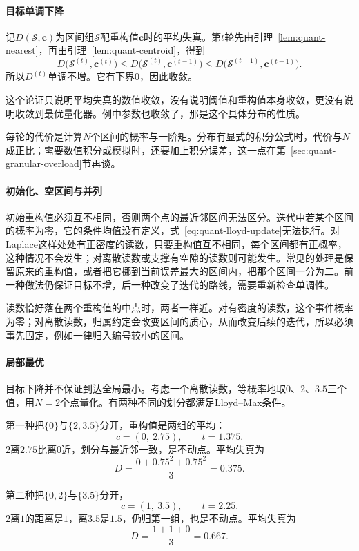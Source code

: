 \paragraph{目标单调下降}
记$D(\mathcal{S},\bm{c})$为区间组$\mathcal{S}$配重构值$\bm{c}$时的平均失真。第$t$轮先由引理~\ref{lem:quant-nearest}，再由引理~\ref{lem:quant-centroid}，得到
\[
 D\bigl(\mathcal{S}^{(t)},\bm{c}^{(t)}\bigr)\leq D\bigl(\mathcal{S}^{(t)},\bm{c}^{(t-1)}\bigr)\leq D\bigl(\mathcal{S}^{(t-1)},\bm{c}^{(t-1)}\bigr) .
\]
所以$D^{(t)}$单调不增。它有下界$0$，因此收敛。

这个论证只说明平均失真的数值收敛，没有说明阈值和重构值本身收敛，更没有说明收敛到最优量化器。例中参数也收敛了，那是这个具体分布的性质。

每轮的代价是计算$N$个区间的概率与一阶矩。分布有显式的积分公式时，代价与$N$成正比；需要数值积分或模拟时，还要加上积分误差，这一点在第~\ref{sec:quant-granular-overload}节再谈。

\paragraph{初始化、空区间与并列}
初始重构值必须互不相同，否则两个点的最近邻区间无法区分。迭代中若某个区间的概率为零，它的条件均值没有定义，式~\eqref{eq:quant-lloyd-update}无法执行。对Laplace这样处处有正密度的读数，只要重构值互不相同，每个区间都有正概率，这种情况不会发生；对离散读数或支撑有空隙的读数则可能发生。常见的处理是保留原来的重构值，或者把它挪到当前误差最大的区间内，把那个区间一分为二。前一种做法仍保证目标不增，后一种改变了迭代的路线，需要重新检查单调性。

读数恰好落在两个重构值的中点时，两者一样近。对有密度的读数，这个事件概率为零；对离散读数，归属约定会改变区间的质心，从而改变后续的迭代，所以必须事先固定，例如一律归入编号较小的区间。

\paragraph{局部最优}
目标下降并不保证到达全局最小。考虑一个离散读数，等概率地取$0$、$2$、$3.5$三个值，用$N=2$个点量化。有两种不同的划分都满足Lloyd--Max条件。

第一种把$\{0\}$与$\{2,3.5\}$分开，重构值是两组的平均：
\[
 c=(0,\ 2.75),\qquad t=1.375 .
\]
$2$离$2.75$比离$0$近，划分与最近邻一致，是不动点。平均失真为
\[
 D=\frac{0+0.75^{2}+0.75^{2}}{3}=0.375 .
\]

第二种把$\{0,2\}$与$\{3.5\}$分开，
\[
 c=(1,\ 3.5),\qquad t=2.25 .
\]
$2$离$1$的距离是$1$，离$3.5$是$1.5$，仍归第一组，也是不动点。平均失真为
\[
 D=\frac{1+1+0}{3}=0.667 .
\]

